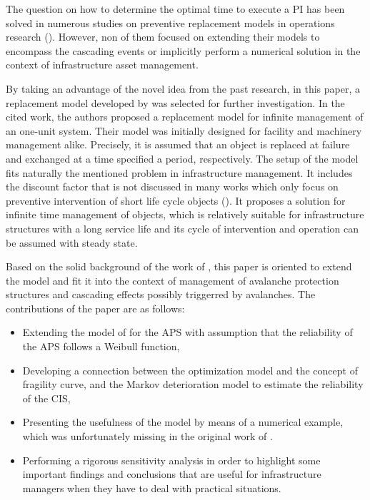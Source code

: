 \documentclass[fleqn]{article}
\begin{document}
The question on how to determine the optimal time to execute a PI has been solved in numerous studies on preventive replacement models in operations research (\cite{gertsbakh97, Gertsbakh2000, Kaio1984, Chen1992, Berg1978}). However, non of them focused on extending their models to encompass the cascading events or implicitly perform a numerical solution in the context of infrastructure asset management. 

By taking an advantage of the novel idea from the past research, in this paper, a replacement model developed by \cite{Kaio1984} was selected for further investigation. In the cited work, the authors proposed a replacement model for infinite management of an one-unit system. Their model was initially designed for facility and machinery management alike. Precisely, it is assumed that an object is replaced at failure and exchanged at a time specified a period, respectively. The setup of the model fits naturally the mentioned problem in infrastructure management. It includes the discount factor that is not discussed in many works which only focus on preventive intervention of short life cycle objects (\cite{gertsbakh97}). It proposes a solution for infinite time management of objects, which is relatively suitable for infrastructure structures with a long service life and its cycle of intervention and operation can be assumed with steady state. 

Based on the solid background of the work of \cite{Kaio1984}, this paper is oriented to extend the model and fit it into the context of management of avalanche protection structures and cascading effects possibly triggerred by avalanches. The contributions of the paper are as follows:

\begin{itemize}
	\item Extending the model of \cite{Kaio1984} for the APS with assumption that the reliability of the APS follows a Weibull function,
	\item Developing a connection between the optimization model and the concept of fragility curve, and the Markov deterioration model to estimate the reliability of the CIS,
	\item Presenting the usefulness of the model by means of a numerical example, which was unfortunately missing in the original work of \cite{Kaio1984}.
	\item Performing a rigorous sensitivity analysis in order to highlight some important findings and conclusions that are useful for infrastructure managers when they have to deal with practical situations.
\end{itemize}
\end{document}

